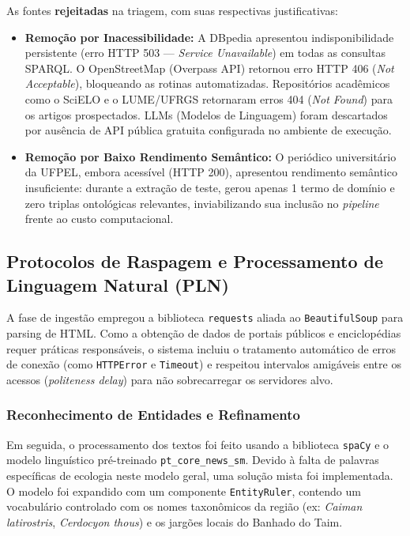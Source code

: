 \documentclass[10pt,conference]{IEEEtran}
\begin{document}
As fontes \textbf{rejeitadas} na triagem, com suas respectivas justificativas:

\begin{itemize}
    \item \textbf{Remoção por Inacessibilidade:} A DBpedia apresentou indisponibilidade persistente (erro HTTP 503 — \textit{Service Unavailable}) em todas as consultas SPARQL. O OpenStreetMap (Overpass API) retornou erro HTTP 406 (\textit{Not Acceptable}), bloqueando as rotinas automatizadas. Repositórios acadêmicos como o SciELO e o LUME/UFRGS retornaram erros 404 (\textit{Not Found}) para os artigos prospectados. LLMs (Modelos de Linguagem) foram descartados por ausência de API pública gratuita configurada no ambiente de execução.

    \item \textbf{Remoção por Baixo Rendimento Semântico:} O periódico universitário da UFPEL, embora acessível (HTTP 200), apresentou rendimento semântico insuficiente: durante a extração de teste, gerou apenas 1 termo de domínio e zero triplas ontológicas relevantes, inviabilizando sua inclusão no \textit{pipeline} frente ao custo computacional.
\end{itemize}

\subsection{Protocolos de Raspagem e Processamento de Linguagem Natural (PLN)}

A fase de ingestão empregou a biblioteca \texttt{requests} aliada ao \texttt{BeautifulSoup} para parsing de HTML. Como a obtenção de dados de portais públicos e enciclopédias requer práticas responsáveis, o sistema incluiu o tratamento automático de erros de conexão (como \texttt{HTTPError} e \texttt{Timeout}) e respeitou intervalos amigáveis entre os acessos (\textit{politeness delay}) para não sobrecarregar os servidores alvo.

\subsubsection{Reconhecimento de Entidades e Refinamento}

Em seguida, o processamento dos textos foi feito usando a biblioteca \texttt{spaCy} e o modelo linguístico pré-treinado \texttt{pt\_core\_news\_sm}. Devido à falta de palavras específicas de ecologia neste modelo geral, uma solução mista foi implementada. O modelo foi expandido com um componente \texttt{EntityRuler}, contendo um vocabulário controlado com os nomes taxonômicos da região (ex: \textit{Caiman latirostris}, \textit{Cerdocyon thous}) e os jargões locais do Banhado do Taim.
\end{document}
